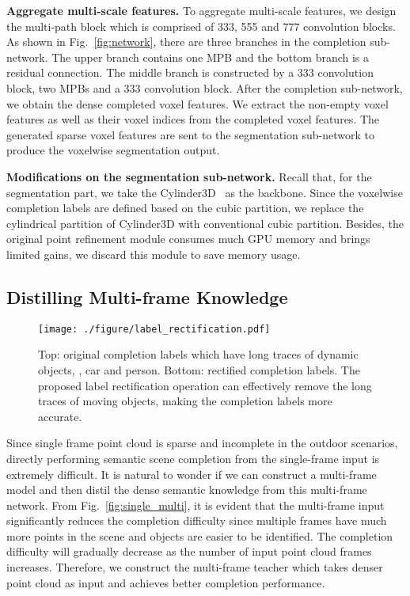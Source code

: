 \documentclass[10pt,twocolumn,letterpaper]{article}
\begin{document}
\noindent \textbf{Aggregate multi-scale features.} To aggregate multi-scale features, we design the multi-path block which is comprised of 333, 555 and 777 convolution blocks. As shown in Fig.~\ref{fig:network}, there are three branches in the completion sub-network. The upper branch contains one MPB and the bottom branch is a residual connection. The middle branch is constructed by a 333 convolution block, two MPBs and a 333 convolution block. After the completion sub-network, we obtain the dense completed voxel features. We extract the non-empty voxel features as well as their voxel indices from the completed voxel features. The generated sparse voxel features are sent to the segmentation sub-network to produce the voxelwise segmentation output.

\noindent \textbf{Modifications on the segmentation sub-network.} Recall that, for the segmentation part, we take the Cylinder3D~\cite{zhu2021cylindrical} as the backbone. Since the voxelwise completion labels are defined based on the cubic partition, we replace the cylindrical partition of Cylinder3D with conventional cubic partition. Besides, the original point refinement module consumes much GPU memory and brings limited gains, we discard this module to save memory usage.




\subsection{Distilling Multi-frame Knowledge}

\begin{figure}[ht]
 \centering
 \texttt{[image: ./figure/label\_rectification.pdf]}
 \vskip -0.2cm
 \caption{Top: original completion labels which have long traces of dynamic objects, \eg, car and person. Bottom: rectified completion labels. The proposed label rectification operation can effectively remove the long traces of moving objects, making the completion labels more accurate.}
 \centering
 \vskip -0.2cm
 \label{fig:trace}
\end{figure}

Since single frame point cloud is sparse and incomplete in the outdoor scenarios, directly performing semantic scene completion from the single-frame input is extremely difficult. It is natural to wonder if we can construct a multi-frame model and then distil the dense semantic knowledge from this multi-frame network. From Fig.~\ref{fig:single_multi}, it is evident that the multi-frame input significantly reduces the completion difficulty since multiple frames have much more points in the scene and objects are easier to be identified. The completion difficulty will gradually decrease as the number of input point cloud frames increases. Therefore, we construct the multi-frame teacher which takes denser point cloud as input and achieves better completion performance. 
\end{document}
